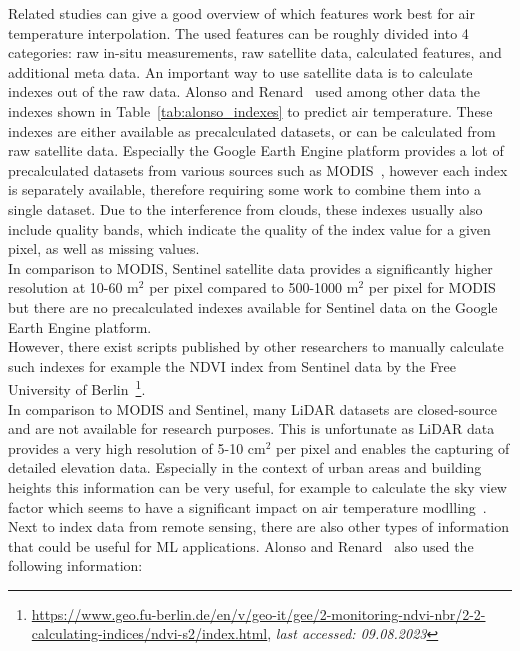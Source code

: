 Related studies can give a good overview of which features work best for air temperature interpolation. The used features can be roughly divided into 4 categories: raw in-situ measurements, raw satellite data, calculated features, and additional meta data. An important way to use satellite data is to calculate indexes out of the raw data. Alonso and Renard~\cite{alonso2020new} used among other data the indexes shown in Table~\ref{tab:alonso_indexes} to predict air temperature. These indexes are either available as precalculated datasets, or can be calculated from raw satellite data. Especially the Google Earth Engine platform provides a lot of precalculated datasets from various sources such as MODIS~\cite{didan2021modis}, however each index is separately available, therefore requiring some work to combine them into a single dataset. Due to the interference from clouds, these indexes usually also include quality bands, which indicate the quality of the index value for a given pixel, as well as missing values.\\
In comparison to MODIS, Sentinel satellite data provides a significantly higher resolution at 10-60 m$^2$ per pixel compared to 500-1000 m$^2$ per pixel for MODIS but there are no precalculated indexes available for Sentinel data on the Google Earth Engine platform.\\
However, there exist scripts published by other researchers to manually calculate such indexes for example the NDVI index from Sentinel data by the Free University of Berlin~\footnote{\url{https://www.geo.fu-berlin.de/en/v/geo-it/gee/2-monitoring-ndvi-nbr/2-2-calculating-indices/ndvi-s2/index.html}, \textit{last accessed: 09.08.2023}}.\\
In comparison to MODIS and Sentinel, many LiDAR datasets are closed-source and are not available for research purposes. This is unfortunate as LiDAR data provides a very high resolution of 5-10 cm$^2$ per pixel and enables the capturing of detailed elevation data. Especially in the context of urban areas and building heights this information can be very useful, for example to calculate the sky view factor which seems to have a significant impact on air temperature modlling~\cite{dirksen2019sky}.\\
Next to index data from remote sensing, there are also other types of information that could be useful for ML applications. Alonso and Renard~\cite{alonso2020new} also used the following information:

